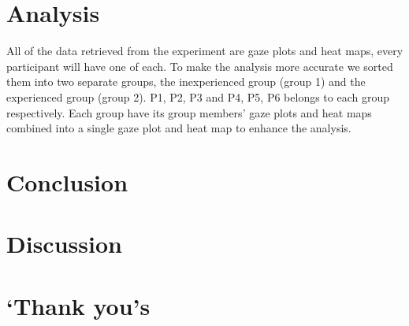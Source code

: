 \documentclass{report}
\begin{document}
\chapter{Analysis}
All of the data retrieved from the experiment are gaze plots and heat maps, every participant will have one of each. To make the analysis more accurate we sorted them into two separate groups, the inexperienced group (group 1) and the experienced group (group 2). P1, P2, P3 and P4, P5, P6 belongs to each group respectively. Each group have its group members’ gaze plots and heat maps combined into a single gaze plot and heat map to enhance the analysis.

\chapter{Conclusion}

\chapter{Discussion}

\chapter{`Thank you's}
\end{document}

